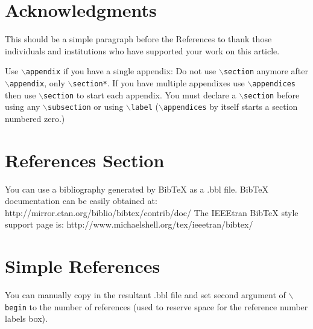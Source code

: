 \documentclass[lettersize,journal]{IEEEtran}
\begin{document}
\section*{Acknowledgments}
This should be a simple paragraph before the References to thank those individuals and institutions who have supported your work on this article.



{
Use $\backslash${\tt{appendix}} if you have a single appendix:
Do not use $\backslash${\tt{section}} anymore after $\backslash${\tt{appendix}}, only $\backslash${\tt{section*}}.
If you have multiple appendixes use $\backslash${\tt{appendices}} then use $\backslash${\tt{section}} to start each appendix.
You must declare a $\backslash${\tt{section}} before using any $\backslash${\tt{subsection}} or using $\backslash${\tt{label}} ($\backslash${\tt{appendices}} by itself
 starts a section numbered zero.)}






\section{References Section}
You can use a bibliography generated by BibTeX as a .bbl file.
 BibTeX documentation can be easily obtained at:
 http://mirror.ctan.org/biblio/bibtex/contrib/doc/
 The IEEEtran BibTeX style support page is:
 http://www.michaelshell.org/tex/ieeetran/bibtex/
 
%
%
\section{Simple References}
You can manually copy in the resultant .bbl file and set second argument of $\backslash${\tt{begin}} to the number of references
 (used to reserve space for the reference number labels box).
\end{document}
